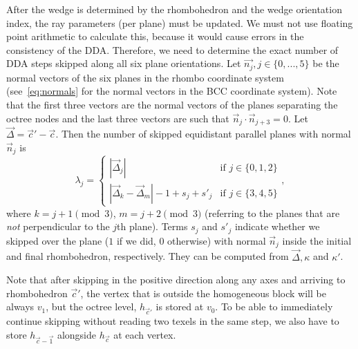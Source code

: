 \documentclass[journal]{vgtc}                     %
\begin{document}
After the wedge is determined by the rhombohedron and the wedge orientation index, the ray parameters (per plane) must be updated. We must not use floating point arithmetic to calculate this, because it would cause errors in the consistency of the DDA. Therefore, we need to determine the exact number of DDA steps skipped along all six plane orientations. Let $\vec{n_j}, j \in \{0,...,5\}$ be the normal vectors of the six planes in the rhombo coordinate system (see~\cref{eq:normals} for the normal vectors in the BCC coordinate system). Note that the first three vectors are the normal vectors of the planes separating the octree nodes and the last three vectors are such that $\vec{n}_j \cdot \vec{n}_{j+3} = 0$.
Let $\vec{\Delta} = \vec{c}'-\vec{c}$. Then the number of skipped equidistant parallel planes with normal $\vec{n}_j$ is 
\begin{equation} \label{eq:skipplane}
	\lambda_j = \begin{cases}
		|\vec{\Delta}_j| &\text{if $j\in \{0,1,2\}$}\\
		|\vec{\Delta}_k - \vec{\Delta}_m| - 1 + s_j + s'_j  &\text{if $j\in \{3,4,5\}$}
	\end{cases},
\end{equation}
where $k=j+1 \pmod{3}$, $m=j+2 \pmod{3}$ (referring to the planes that are \emph{not} perpendicular to the $j$th plane). Terms $s_j$ and $s'_j$ indicate whether we skipped over the plane ($1$ if we did, $0$ otherwise) with normal $\vec{n}_j$ inside the initial and final rhombohedron, respectively. They can be computed from $\vec{\Delta}, \kappa$ and $\kappa'$.

Note that after skipping in the positive direction along any axes and arriving to rhombohedron $\vec{c}'$, the vertex that is outside the homogeneous block will be always $v_1$, but the octree level, $h_{\vec{c}'}$ is stored at $v_0$. To be able to immediately continue skipping without reading two texels in the same step, we also have to store $h_{\vec{c}-\vec{1}}$ alongside $h_{\vec{c}}$ at each vertex.

\end{document}
